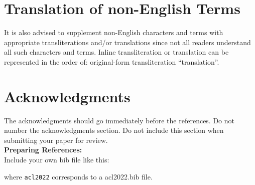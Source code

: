 \documentclass[11pt,a4paper]{article}
\begin{document}
\section{Translation of non-English Terms}

It is also advised to supplement non-English characters and terms
with appropriate transliterations and/or translations
since not all readers understand all such characters and terms.
Inline transliteration or translation can be represented in
the order of: original-form transliteration ``translation''.

\section*{Acknowledgments}

The acknowledgments should go immediately before the references.  Do
not number the acknowledgments section. Do not include this section
when submitting your paper for review. \\

\noindent \textbf{Preparing References:} \\
Include your own bib file like this:
\verb||
\verb|| 

where \verb|acl2022| corresponds to a acl2022.bib file.


\end{document}
